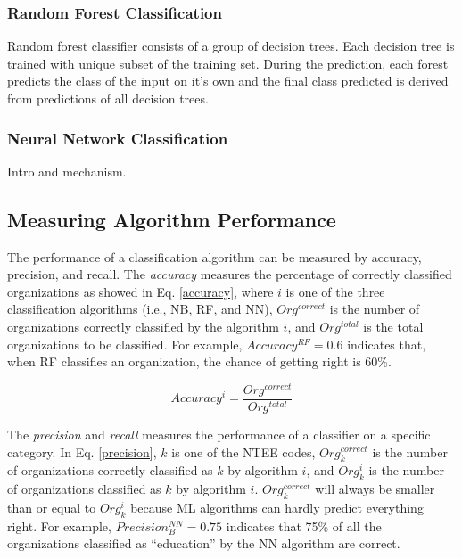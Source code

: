 \documentclass[12pt]{article}
\begin{document}
\subsubsection{Random Forest Classification}

Random forest classifier consists of a group of decision trees. Each decision tree is trained with unique subset of the training set. During the prediction, each forest predicts the class of the input on it's own and the final class predicted is derived from predictions of all decision trees.

\subsubsection{Neural Network Classification}

Intro and mechanism.

\subsection{Measuring Algorithm Performance}

The performance of a classification algorithm can be measured by {accuracy}, {precision}, and {recall}. The \textit{accuracy} measures the percentage of correctly classified organizations as showed in Eq. \ref{accuracy}, where $i$ is one of the three classification algorithms (i.e., NB, RF, and NN), $Org^{correct}$ is the number of organizations correctly classified by the algorithm $i$, and $Org^{total}$ is the total organizations to be classified. For example, $Accuracy^{RF}=0.6$ indicates that, when RF classifies an organization, the chance of getting right is 60\%.

\begin{equation} \label{accuracy}
    Accuracy^i=\frac{Org^{correct}}{Org^{total}}
\end{equation}

The \textit{precision} and \textit{recall} measures the performance of a classifier on a specific category. In Eq. \ref{precision}, $k$ is one of the NTEE codes, $Org^{correct}_{k}$ is the number of organizations correctly classified as $k$ by algorithm $i$, and ${Org^{i}_{k}}$ is the number of organizations classified as $k$ by algorithm $i$. $Org^{correct}_{k}$ will always be smaller than or equal to ${Org^{i}_{k}}$ because ML algorithms can hardly predict everything right. For example, $Precision^{NN}_{B}=0.75$ indicates that 75\% of all the organizations classified as ``education'' by the NN algorithm are correct.
\end{document}
